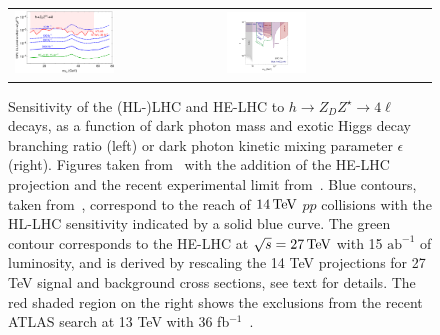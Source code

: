 \begin{figure}
\begin{tabular}{m{} m{}}
\includegraphics[width=0.5\textwidth]{section9/plots/zzdbrplot}
&
\includegraphics[width=0.4\textwidth]{section9/plots/new_zzdplot_epsilon}
\end{tabular}
\caption{
Sensitivity of the (HL-)LHC and HE-LHC to  $h \to Z_D Z^{\star} \to 4 \ell$ decays, as a function of dark photon mass and exotic Higgs decay branching ratio (left) or dark photon kinetic mixing parameter $\epsilon$ (right). Figures taken from~\cite{Curtin:2014cca} with the addition of the HE-LHC projection and the recent experimental limit from~\cite{Aaboud:2018fvk}.
%
 Blue contours, taken from~\cite{Curtin:2014cca}, correspond to the reach of $14 \,\text{Te\hspace{-.08em}V}$ $pp$ collisions with the HL-LHC sensitivity indicated by a solid blue curve. The green contour corresponds to the HE-LHC at $\sqrt{s} = 27 \,\text{Te\hspace{-.08em}V}$ with 15 $\mathrm{ab}^{-1}$ of luminosity, and is derived by rescaling the 14 TeV projections for 27 TeV signal and background cross sections, see text for details. The red shaded region on the right shows the exclusions from the recent ATLAS search at 13 TeV with 36 fb$^{-1}$~\cite{Aaboud:2018fvk}.
}
\label{f.darkphotonZZD}
\end{figure}



